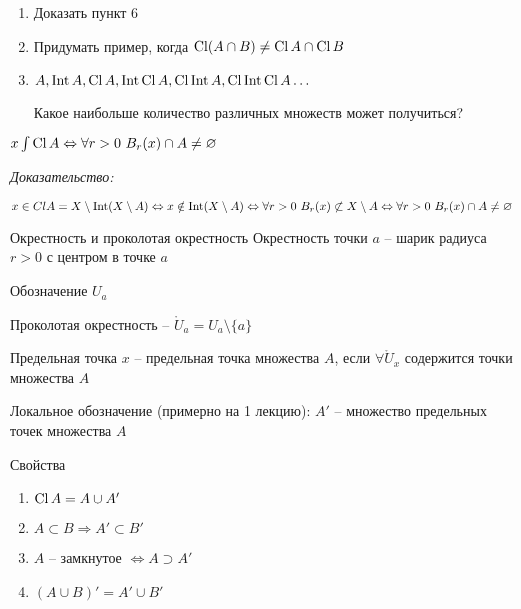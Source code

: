 \documentclass[12pt]{article}
\begin{document}
\begin{Exercise}{}
    \begin{enumerate}
        \item Доказать пункт 6
        \item Придумать пример, когда $\operatorname{Cl} (A \cap B) \neq \operatorname{Cl} A \cap \operatorname{Cl} B$
        \item $A, \operatorname{Int} A, \operatorname{Cl} A, \operatorname{Int} \operatorname{Cl} A, \operatorname{Cl} \operatorname{Int} A, \operatorname{Cl} \operatorname{Int} \operatorname{Cl} A \ldots$
        
        Какое наибольше количество различных множеств может получиться?
    \end{enumerate}
\end{Exercise}

\begin{theo}{}
    $x \int \operatorname{Cl} A \Leftrightarrow \forall r > 0\ B_r(x) \cap A \neq \varnothing$
\end{theo}

\textit{Доказательство:}

$x \in Cl A = X \setminus \operatorname{Int} (X \setminus A) \Leftrightarrow x \notin \operatorname{Int} (X \setminus A) \Leftrightarrow \forall r > 0\ B_r(x) \not\subset X \setminus A \Leftrightarrow \forall r > 0\ B_r(x) \cap A \neq \varnothing$

\begin{defin}{Окрестность и проколотая окрестность}
    Окрестность точки $a$ -- шарик радиуса $r > 0$ с центром в точке $a$

    Обозначение $U_a$

    Проколотая окрестность -- $\mathring{U}_a = U_a \setminus \{a\}$
\end{defin}

\begin{defin}{Предельная точка}
    $x$ -- предельная точка множества $A$, если $\forall \mathring{U}_x$ содержится точки множества $A$

    Локальное обозначение (примерно на 1 лекцию): $A'$ -- множество предельных точек множества $A$
\end{defin}

\begin{theo}{Свойства}
    \begin{enumerate}
        \item $\operatorname{Cl} A = A \cup A'$
        \item $A \subset B \Rightarrow A' \subset B'$
        \item $A$ -- замкнутое $\Leftrightarrow A \supset A'$
        \item $(A \cup B)' = A' \cup B'$
    \end{enumerate}
\end{theo}
\end{document}

